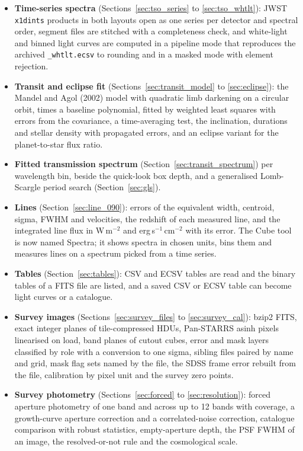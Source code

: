 \documentclass[11pt,a4paper]{article}
\newcommand{\code}[1]{\texttt{\small #1}}
\begin{document}
    \begin{itemize}[nosep]
    \item \textbf{Time-series spectra} (Sections~\ref{sec:tso_series} to \ref{sec:tso_whtlt}): JWST \code{x1dints} products in both layouts open as one series per detector and spectral order, segment files are stitched with a completeness check, and white-light and binned light curves are computed in a pipeline mode that reproduces the archived \code{\_whtlt.ecsv} to rounding and in a masked mode with element rejection.
    \item \textbf{Transit and eclipse fit} (Sections~\ref{sec:transit_model} to \ref{sec:eclipse}): the Mandel and Agol (2002) model with quadratic limb darkening on a circular orbit, times a baseline polynomial, fitted by weighted least squares with errors from the covariance, a time-averaging test, the inclination, durations and stellar density with propagated errors, and an eclipse variant for the planet-to-star flux ratio.
    \item \textbf{Fitted transmission spectrum} (Section~\ref{sec:transit_spectrum}) per wavelength bin, beside the quick-look box depth, and a generalised Lomb-Scargle period search (Section~\ref{sec:gls}).
    \item \textbf{Lines} (Section~\ref{sec:line_090}): errors of the equivalent width, centroid, sigma, FWHM and velocities, the redshift of each measured line, and the integrated line flux in W\,m$^{-2}$ and erg\,s$^{-1}$\,cm$^{-2}$ with its error. The Cube tool is now named Spectra; it shows spectra in chosen units, bins them and measures lines on a spectrum picked from a time series.
    \item \textbf{Tables} (Section~\ref{sec:tables}): CSV and ECSV tables are read and the binary tables of a FITS file are listed, and a saved CSV or ECSV table can become light curves or a catalogue.
    \item \textbf{Survey images} (Sections~\ref{sec:survey_files} to \ref{sec:survey_cal}): bzip2 FITS, exact integer planes of tile-compressed HDUs, Pan-STARRS asinh pixels linearised on load, band planes of cutout cubes, error and mask layers classified by role with a conversion to one sigma, sibling files paired by name and grid, mask flag sets named by the file, the SDSS frame error rebuilt from the file, calibration by pixel unit and the survey zero points.
    \item \textbf{Survey photometry} (Sections~\ref{sec:forced} to \ref{sec:resolution}): forced aperture photometry of one band and across up to 12 bands with coverage, a growth-curve aperture correction and a correlated-noise correction, catalogue comparison with robust statistics, empty-aperture depth, the PSF FWHM of an image, the resolved-or-not rule and the cosmological scale.
    \end{itemize}
\end{document}
